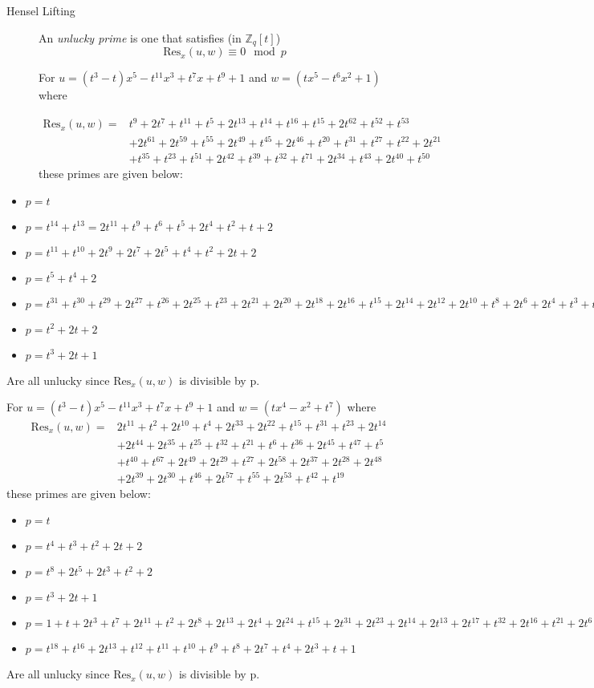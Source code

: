 \documentclass[10pt]{report}
\theoremstyle{plain}
\theoremstyle{definition}
\newcommand{\point}[1]{\begin{itemize} \item[$\cdot$] #1 \end{itemize}}
\newcommand{\fieldt}{\mathbb{Z}_q[t]}
\newcommand{\Res}[1]{\textrm{Res}_{#1} }
\begin{document}
\hfill
\begin{description}
\item[Hensel Lifting] An \emph{unlucky prime} is one that satisfies (in $\fieldt$)
$$\Res{x}(u,w) \equiv 0 \mod p$$
 
For $u=(t^3-t)x^5-t^{11}x^3+t^7x+t^9+1$ and $w=(tx^5-t^6x^2+1)$ where 

\begin{align*}
	\Res{x}(u,w)= 	{}& t^9+2t^7+t^{11}+t^5+2t^{13}+t^{14}+t^{16}+t^{15}+2t^{62}+t^{52}+t^{53} \\
				{}& +2t^{61}+2t^{59}+t^{55}+2t^{49}+t^{45}+2t^{46}+t^{20}+t^{31}+t^{27}+t^{22}+2t^{21} \\
				{}& +t^{35}+t^{23}+t^{51}+2t^{42}+t^{39}+t^{32}+t^{71}+2t^{34}+t^{43}+2t^{40}+t^{50} 
\end{align*}
these primes are given below:
\end{description}

\point{$p=t$}
\point{$p=t^{14}+t^{13}=2t^{11}+t^{9}+t^6+t^5+2t^4+t^2+t+2$}
\point{$p=t^{11}+t^{10}+2t^9+2t^7+2t^5+t^4+t^2+2t+2$}
\point{$p=t^5+t^4+2$}
\point{$p=t^{31}+t^{30}+t^{29}+2t^{27}+t^{26}+2t^{25}+t^{23}+2t^{21}+2t^{20}+2t^{18}+2t^{16}+t^{15}+2t^{14}+2t^{12}+2t^{10}+t^8+2t^6+2t^4+t^3+t^2+1$}
\point{$p=t^2+2t+2$}
\point{$p=t^3+2t+1$}

Are all unlucky since $\Res{x}(u, w)$ is divisible by p.

\clearpage
For $u=(t^3-t)x^5-t^{11}x^3+t^7x+t^9+1$ and $w=(tx^4-x^2+t^7)$ where 
\begin{align*}
	\Res{x}(u,w)=	{}& 2t^{11}+t^2+2t^{10}+t^4+2t^{33}+2t^{22}+t^{15}+t^{31}+t^{23}+2t^{14} \\
				{}& +2t^{44}+2t^{35}+t^{25}+t^{32}+t^{21}+t^6+t^{36}+2t^{45}+t^{47}+t^5 \\
				{}& +t^{40}+t^{67}+2t^{49}+2t^{29}+t^{27}+2t^{58}+2t^{37}+2t^{28}+2t^{48} \\
				{}& +2t^{39}+2t^{30}+t^{46}+2t^{57}+t^{55}+2t^{53}+t^{42}+t^{19}
\end{align*}
these primes are given below:

\point{$p=t$}
\point{$p=t^4+t^3+t^2+2t+2$}
\point{$p=t^8+2t^5+2t^3+t^2+2$}
\point{$p=t^3+2t+1$}
\point{$p=1+t+2t^3+t^7+2t^{11}+t^2+2t^8+2t^{13}+2t^4+2t^{24}+t^{15}+2t^{31}+2t^{23}+2t^{14}+2t^{13}+2t^{17}+t^{32}+2t^{16}+t^{21}+2t^6+2t^{18}+2t^5+2t^{29}+2t^{27}+2t^{28}$ }
\point{$p=t^{18}+t^{16}+2t^{13}+t^{12}+t^{11}+t^{10}+t^9+t^8+2t^7+t^4+2t^3+t+1$}

Are all unlucky since $\Res{x}(u, w)$ is divisible by p.
\end{document}
